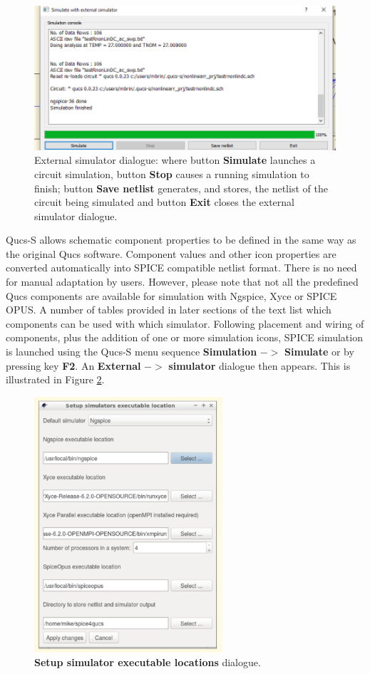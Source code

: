\documentclass[10pt, a4paper]{report}
\begin{document}
\begin{figure}[ht]
	\centering
	\includegraphics[width=13cm]{pics/chap2/simDialog.pdf}
	\caption{ External simulator dialogue: where button \textbf{Simulate} launches a circuit simulation, button \textbf{Stop} causes a running simulation to finish; button \textbf{Save netlist} generates, and stores, the netlist of the circuit being simulated and button \textbf{Exit} closes the external simulator dialogue.}
	\label{Fig9}
\end{figure}

\noindent Qucs-S allows schematic component properties to be defined in the same way as the original Qucs software. Component values and other icon properties are converted automatically into SPICE compatible netlist format. There is no need for manual adaptation by users. However, please note that not all the predefined Qucs components are available for simulation with Ngspice, Xyce or SPICE OPUS.   A number of tables provided in later sections of the text list which components can be used with which simulator. Following placement and wiring of components, plus the addition of one or more simulation icons, SPICE simulation is launched using the Qucs-S menu sequence  \textbf{Simulation} $->$ \textbf{Simulate} or by pressing key \textbf{F2}.  An  \textbf{External} $->$ \textbf{simulator} dialogue  then appears.  This is illustrated in Figure \ref{Fig10}.
\newpage
 \begin{figure}[h]
	\centering
	\includegraphics[width=7cm]{pics/chap2/Simsett.pdf}
	\caption{\textbf{Setup simulator executable locations} dialogue.}
	\label{Fig10}
\end{figure}
\end{document}
